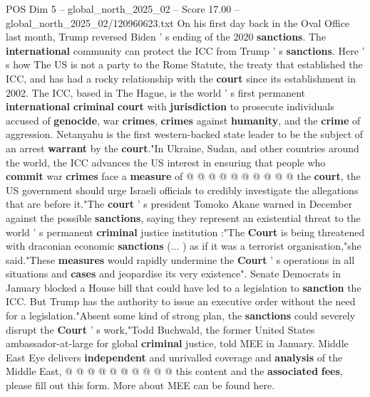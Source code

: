 \begin{textsample}{POS Dim 5 – global\_north\_2025\_02 – Score 17.00 – global\_north\_2025\_02/120960623.txt}
On his first day back in the Oval Office last month, Trump reversed Biden ' s ending of the 2020 \textbf{sanctions}.
The \textbf{international} community can protect the ICC from Trump ' s \textbf{sanctions}.
Here ' s how The US is not a party to the Rome Statute, the treaty that established the ICC, and has had a rocky relationship with the \textbf{court} since its establishment in 2002.
The ICC, based in The Hague, is the world ' s first permanent \textbf{international} \textbf{criminal} \textbf{court} with \textbf{jurisdiction} to prosecute individuals accused of \textbf{genocide}, war \textbf{crimes}, \textbf{crimes} against \textbf{humanity}, and the \textbf{crime} of aggression.
Netanyahu is the first western-backed state leader to be the subject of an arrest \textbf{warrant} by the \textbf{court}."In Ukraine, Sudan, and other countries around the world, the ICC advances the US interest in ensuring that people who \textbf{commit} war \textbf{crimes} face a \textbf{measure} of @ @ @ @ @ @ @ @ @ @ the \textbf{court}, the US government should urge Israeli officials to credibly investigate the allegations that are before it."The \textbf{court} ' s president Tomoko Akane warned in December against the possible \textbf{sanctions}, saying they represent an existential threat to the world ' s permanent \textbf{criminal} justice institution :"The \textbf{Court} is being threatened with draconian economic \textbf{sanctions} (... ) as if it was a terrorist organisation,"she said."These \textbf{measures} would rapidly undermine the \textbf{Court} ' s operations in all situations and \textbf{cases} and jeopardise its very existence".
Senate Democrats in January blocked a House bill that could have led to a legislation to \textbf{sanction} the ICC.
But Trump has the authority to issue an executive order without the need for a legislation."Absent some kind of strong plan, the \textbf{sanctions} could severely disrupt the \textbf{Court} ' s work,"Todd Buchwald, the former United States ambassador-at-large for global \textbf{criminal} justice, told MEE in January.
Middle East Eye delivers \textbf{independent} and unrivalled coverage and \textbf{analysis} of the Middle East, @ @ @ @ @ @ @ @ @ @ this content and the \textbf{associated} \textbf{fees}, please fill out this form.
More about MEE can be found here.

\end{textsample}
